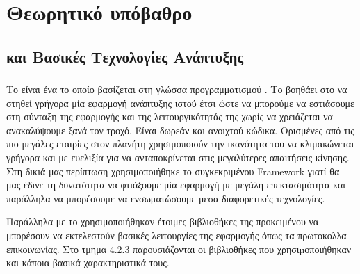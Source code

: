 \chapter{Θεωρητικό υπόβαθρο}

\section{ και Βασικές Τεχνολογίες Ανάπτυξης}

\subsection{}

Το  είναι ένα  το οποίο βασίζεται στη γλώσσα προγραμματισμού . 
Το  βοηθάει στο να στηθεί γρήγορα μία εφαρμογή ανάπτυξης ιστού έτσι ώστε να μπορούμε να εστιάσουμε στη σύνταξη της εφαρμογής και της λειτουργικότητάς της χωρίς να χρειάζεται να ανακαλύψουμε ξανά τον τροχό.
Είναι δωρεάν και ανοιχτού κώδικα. Ορισμένες από τις πιο μεγάλες εταιρίες στον πλανήτη χρησιμοποιούν την ικανότητα του
να κλιμακώνεται γρήγορα και με ευελιξία για να ανταποκρίνεται στις μεγαλύτερες απαιτήσεις κίνησης. Στη δικιά μας περίπτωση χρησιμοποιήθηκε το συγκεκριμένου
{Framework} γιατί θα μας έδινε τη δυνατότητα να φτιάξουμε μία εφαρμογή με μεγάλη επεκτασιμότητα και παράλληλα να μπορέσουμε να ενσωματώσουμε μεσα διαφορετικές τεχνολογίες.

Παράλληλα με το  χρησιμοποιήθηκαν έτοιμες βιβλιοθήκες της  προκειμένου να μπορέσουν να εκτελεστούν βασικές λειτουργίες της εφαρμογής όπως 
τα πρωτοκολλα επικοινωνίας. Στο τμημα 4.2.3 παρουσιάζονται οι βιβλιοθήκες που χρησιµοποιήθηκαν και κάποια βασικά χαρακτηριστικά τους.

